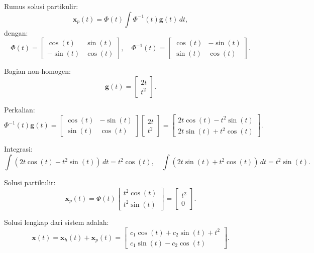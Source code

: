 \documentclass{article}
\begin{document}
    Rumus solusi partikulir:
    \[
    \mathbf{x}_p(t) = \Phi(t) \int \Phi^{-1}(t) \mathbf{g}(t) \, dt,
    \]
    dengan:
    \[
    \Phi(t) = \begin{bmatrix} \cos(t) & \sin(t) \\ -\sin(t) & \cos(t) \end{bmatrix}, \quad \Phi^{-1}(t) = \begin{bmatrix} \cos(t) & -\sin(t) \\ \sin(t) & \cos(t) \end{bmatrix}.
    \]
    
    Bagian non-homogen:
    \[
    \mathbf{g}(t) = \begin{bmatrix} 2t \\ t^2 \end{bmatrix}.
    \]
    
    Perkalian:
    \[
    \Phi^{-1}(t) \mathbf{g}(t) = \begin{bmatrix} \cos(t) & -\sin(t) \\ \sin(t) & \cos(t) \end{bmatrix} \begin{bmatrix} 2t \\ t^2 \end{bmatrix} = \begin{bmatrix} 2t \cos(t) - t^2 \sin(t) \\ 2t \sin(t) + t^2 \cos(t) \end{bmatrix}.
    \]
    
    Integrasi:
    \[
    \int (2t \cos(t) - t^2 \sin(t)) \, dt = t^2 \cos(t), \quad \int (2t \sin(t) + t^2 \cos(t)) \, dt = t^2 \sin(t).
    \]
    
    Solusi partikulir:
    \[
    \mathbf{x}_p(t) = \Phi(t) \begin{bmatrix} t^2 \cos(t) \\ t^2 \sin(t) \end{bmatrix} = \begin{bmatrix} t^2 \\ 0 \end{bmatrix}.
    \]

    Solusi lengkap dari sistem adalah:
    \[
    \mathbf{x}(t) = \mathbf{x}_h(t) + \mathbf{x}_p(t) = \begin{bmatrix} c_1 \cos(t) + c_2 \sin(t) + t^2 \\ c_1 \sin(t) - c_2 \cos(t) \end{bmatrix}.
    \]
\end{document}
